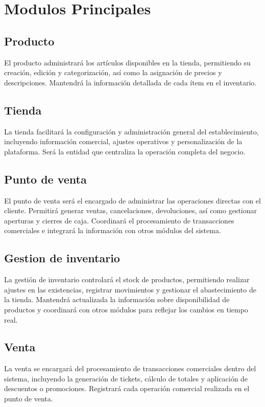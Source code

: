 \documentclass{article}
\begin{document}
\tableofcontents



\newpage
\section{Modulos Principales}

\subsection{Producto}
El producto administrará los artículos disponibles en la tienda, permitiendo su creación, edición y categorización, así como la asignación de precios y descripciones. Mantendrá la información detallada de cada ítem en el inventario.

\subsection{Tienda}
La tienda facilitará la configuración y administración general del establecimiento, incluyendo información comercial, ajustes operativos y personalización de la plataforma. Será la entidad que centraliza la operación completa del negocio.

\subsection{Punto de venta}
El punto de venta será el encargado de administrar las operaciones directas con el cliente. Permitirá generar ventas, cancelaciones, devoluciones, así como gestionar aperturas y cierres de caja. Coordinará el procesamiento de transacciones comerciales e integrará la información con otros módulos del sistema.

\subsection{Gestion de inventario}
La gestión de inventario controlará el stock de productos, permitiendo realizar ajustes en las existencias, registrar movimientos y gestionar el abastecimiento de la tienda. Mantendrá actualizada la información sobre disponibilidad de productos y coordinará con otros módulos para reflejar los cambios en tiempo real.

\subsection{Venta}
La venta se encargará del procesamiento de transacciones comerciales dentro del sistema, incluyendo la generación de tickets, cálculo de totales y aplicación de descuentos o promociones. Registrará cada operación comercial realizada en el punto de venta.
\end{document}
